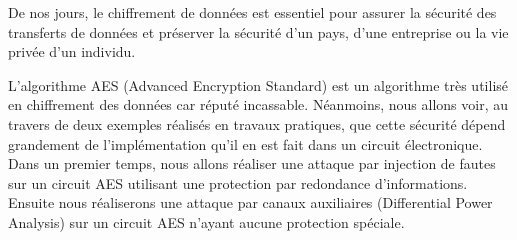 De nos jours, le chiffrement de données est essentiel pour assurer la sécurité
des transferts de données et préserver la sécurité d'un pays, d'une entreprise
ou la vie privée d'un individu.

L'algorithme AES (Advanced Encryption Standard) est un algorithme très utilisé
en chiffrement des données car réputé incassable. Néanmoins, nous allons voir,
au travers de deux exemples réalisés en travaux pratiques, que cette sécurité
dépend grandement de l'implémentation qu'il en est fait dans un circuit
électronique.\\

Dans un premier temps, nous allons réaliser une attaque par injection de fautes sur un
circuit AES utilisant une protection par redondance d'informations.
Ensuite nous réaliserons une attaque par canaux auxiliaires (Differential Power Analysis) sur un circuit
AES n'ayant aucune protection spéciale.
